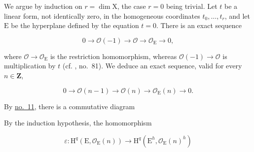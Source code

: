We argue by induction on $r=\dim \mathrm{X}$, the case $r=0$ being trivial. Let $t$ be a linear form, not identically zero, in the homogeneous coordinates $t_0,\ldots,t_r$, and let $\mathrm{E}$ be the hyperplane defined by the equation $t=0$. There is an exact sequence

\begin{equation*}
0\longrightarrow\mathcal{O}(-1)\longrightarrow\mathcal{O}
\longrightarrow\mathcal{O}_\mathrm{E}\longrightarrow0,
\end{equation*}

where $\mathcal{O}\to\mathcal{O}_\mathrm{E}$ is the restriction homomorphism, whereas $\mathcal{O}(-1)\to\mathcal{O}$ is multiplication by $t$ (cf. , no.~81). We deduce an exact sequence, valid for every $n\in\mathbf{Z}$,

\begin{equation*}
0\longrightarrow\mathcal{O}(n-1)\longrightarrow\mathcal{O}(n)
\longrightarrow\mathcal{O}_\mathrm{E}(n)\longrightarrow0.
\end{equation*}

By \hyperref[gaga:no:11]{no.~11}, there is a commutative diagram

\begin{center}
\scriptsize
{}
\end{center}

By the induction hypothesis, the homomorphism

\begin{equation*}
\varepsilon:\mathrm{H}^{q}(\mathrm{E},\mathcal{O}_{\mathrm{E}}(n))
\longrightarrow
\mathrm{H}^{q}(\mathrm{E}^{h},\mathcal{O}_{\mathrm{E}}(n)^{h})
\end{equation*}

